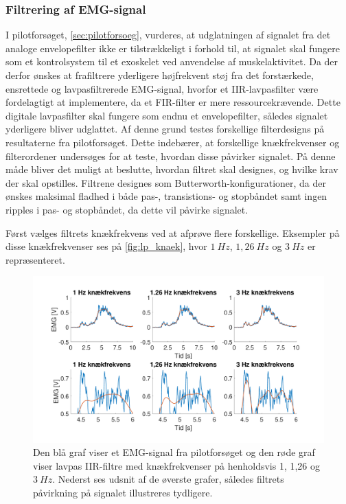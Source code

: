 \subsubsection{Filtrering af EMG-signal} \label{sec:lavpas_krav}
I pilotforsøget, \autoref{sec:pilotforsoeg}, vurderes, at udglatningen af signalet fra det analoge envelopefilter ikke er tilstrækkeligt i forhold til, at signalet skal fungere som et kontrolsystem til et exoskelet ved anvendelse af muskelaktivitet. 
Da der derfor ønskes at frafiltrere yderligere højfrekvent støj fra det forstærkede, ensrettede og lavpasfiltrerede EMG-signal, hvorfor et IIR-lavpasfilter være fordelagtigt at implementere, da et FIR-filter er mere ressourcekrævende. 
Dette digitale lavpasfilter skal fungere som endnu et envelopefilter, således signalet yderligere bliver udglattet. 
Af denne grund testes forskellige filterdesigns på resultaterne fra pilotforsøget. 
Dette indebærer, at forskellige knækfrekvenser og filterordener undersøges for at teste, hvordan disse påvirker signalet. 
På denne måde bliver det muligt at beslutte, hvordan filtret skal designes, og hvilke krav der skal opstilles. 
Filtrene designes som Butterworth-konfigurationer, da der ønskes maksimal fladhed i både pas-, transistions- og stopbåndet samt ingen ripples i pas- og stopbåndet, da dette vil påvirke signalet.

Først vælges filtrets knækfrekvens ved at afprøve flere forskellige. Eksempler på disse knækfrekvenser ses på \autoref{fig:lp_knaek}, hvor $1~Hz$, $1,26~Hz$ og $3~Hz$ er repræsenteret. 

\begin{figure} [H]
\centering
\includegraphics[width=1.0\textwidth]{figures/problemloesning/lavpas_knaek.pdf}
\caption{Den blå graf viser et EMG-signal fra pilotforsøget og den røde graf viser lavpas IIR-filtre med knækfrekvenser på henholdsvis 1, 1,26 og $3~Hz$. Nederst ses udsnit af de øverste grafer, således filtrets påvirkning på signalet illustreres tydligere.}
\label{fig:lp_knaek}
\end{figure} 

